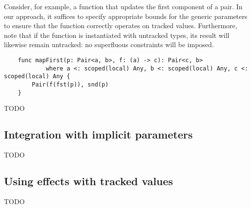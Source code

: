 \documentclass[acmsmall]{acmart}
\begin{document}
Consider, for example, a function that updates the first component of a pair.
In our approach, it suffices to specify appropriate bounds for the generic parameters to ensure that the function correctly operates on tracked values.
Furthermore, note that if the function is instantiated with untracked types, its result will likewise remain untracked: no superfluous constraints will be imposed.
\begin{verbatim}
    func mapFirst(p: Pair<a, b>, f: (a) -> c): Pair<c, b>
            where a <: scoped(local) Any, b <: scoped(local) Any, c <: scoped(local) Any {
        Pair(f(fst(p)), snd(p)
    }
\end{verbatim}


TODO %

\subsection{Integration with implicit parameters}

TODO %

\subsection{Using effects with tracked values}

TODO %

\end{document}
